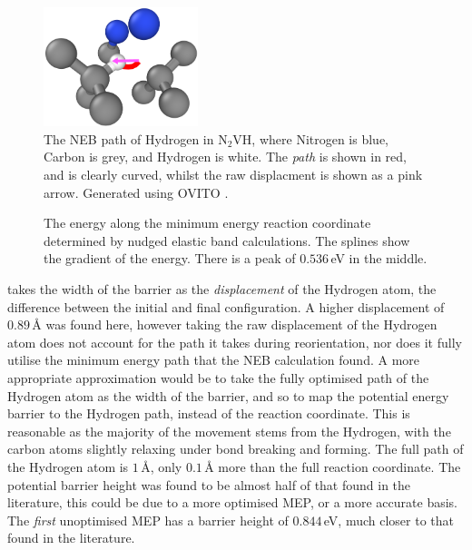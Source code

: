 \documentclass[10pt,a4paper,twocolumn,twoside]{extarticle}
\newcommand{\ntvh}{N$_2$VH}
\begin{document}
\begin{figure}
	\includegraphics[width=0.4\textwidth]{n2vh_2.png}
	\caption{The NEB path of Hydrogen in \ntvh, where Nitrogen is blue, Carbon is grey, and Hydrogen is white. The \emph{path} is shown in red, and is clearly curved, whilst the raw displacment is shown as a pink arrow. Generated using OVITO \cite{OVITO}.}
	\label{fig:n2vh}
\end{figure}


\begin{figure}
		\resizebox{\columnwidth}{!}{%
		
		}
		\caption{The energy along the minimum energy reaction coordinate determined by nudged elastic band calculations. The splines show the gradient of the energy. There is a peak of $0.536$\,eV in the middle.}
		\label{fig:n2vh_energy}
\end{figure}



\textcite{Peaker} takes the width of the barrier as the \emph{displacement} of the Hydrogen atom, the difference between the initial and final configuration. A higher displacement of $0.89$\,{\AA} was found here, however taking the raw displacement of the Hydrogen atom does not account for the path it takes during reorientation, nor does it fully utilise the minimum energy path that the NEB calculation found. A more appropriate approximation would be to take the fully optimised path of the Hydrogen atom as the width of the barrier, and so to map the potential energy barrier to the Hydrogen path, instead of the reaction coordinate. This is reasonable as the majority of the movement stems from the Hydrogen, with the carbon atoms slightly relaxing under bond breaking and forming. The full path of the Hydrogen atom is $1$\,{\AA}, only $0.1$\,{\AA} more than the full reaction coordinate. The potential barrier height was found to be almost half of that found in the literature, this could be due to a more optimised MEP, or a more accurate basis. The \emph{first} unoptimised MEP has a barrier height of $0.844$\,eV, much closer to that found in the literature. 
\end{document}

